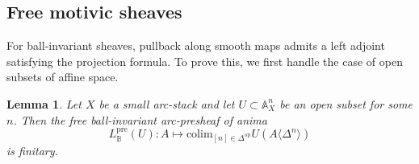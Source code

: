 \documentclass[11pt]{amsart}
\numberwithin{equation}{section}
\numberwithin{theorem}{section}
\newtheorem{lemma}[theorem]{Lemma}
\theoremstyle{definition}
\begin{document}
\subsection{Free motivic sheaves} For ball-invariant sheaves, pullback along smooth maps admits a left adjoint satisfying the projection formula. To prove this, we first handle the case of open subsets of affine space.

\begin{lemma}\label{lem:freemotivicsheafanima} Let $X$ be a small arc-stack and let $U\subset \mathbb A^n_X$ be an open subset for some $n$. Then the free ball-invariant arc-presheaf of anima
\[
L_{\mathbb B}^{\mathrm{pre}}(U): A\mapsto \mathrm{colim}_{[n]\in \Delta^{\mathrm{op}}} U(A\langle\Delta^n\rangle)
\]
is finitary.
\end{lemma}
\end{document}
